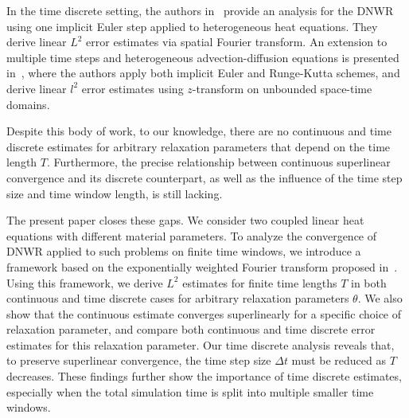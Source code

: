 \documentclass[reqno]{amsart}
\begin{document}
In the time discrete setting, the authors in~\cite{hencha:09} provide an analysis for the DNWR using one implicit Euler step applied to heterogeneous heat equations. They derive linear $L^2$ error estimates via spatial Fourier transform. An extension to multiple time steps and heterogeneous advection-diffusion equations is presented in~\cite{clement2022}, where the authors apply both implicit Euler and Runge-Kutta schemes, and derive linear $l^2$ error estimates using $z$-transform on unbounded space-time domains. 

Despite this body of work, to our knowledge, there are no continuous and time discrete estimates for arbitrary relaxation parameters that depend on the time length $T$. Furthermore, the precise relationship between continuous superlinear convergence and its discrete counterpart, as well as the influence of the time step size and time window length, is still lacking. 

The present paper closes these gaps. We consider two coupled linear heat equations with different material parameters. To analyze the convergence of DNWR applied to such problems on finite time windows, we introduce a framework based on the exponentially weighted Fourier transform proposed in~\cite{Kwok2025}. Using this framework, we derive $L^2$ estimates for finite time lengths $T$ in both continuous and time discrete cases for arbitrary relaxation parameters $\theta$. We also show that the continuous estimate converges superlinearly for a specific choice of relaxation parameter, and compare both continuous and time discrete error estimates for this relaxation parameter. 
Our time discrete analysis reveals that, to preserve superlinear convergence, the time step size $\Delta t$ must be reduced as $T$ decreases. These findings further show the importance of time discrete estimates, especially when the total simulation time is split into multiple smaller time windows.

\end{document}
